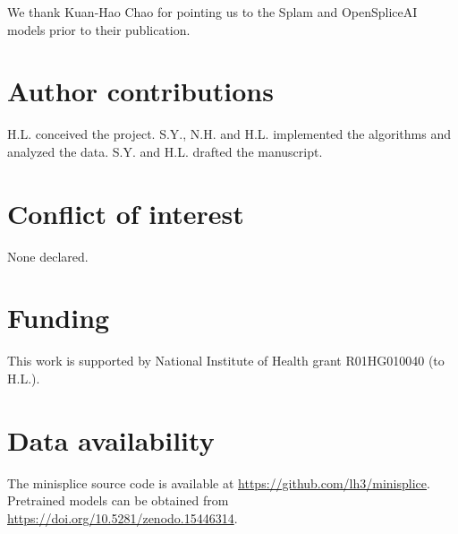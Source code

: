 \documentclass[webpdf,contemporary,large,namedate]{oup-authoring-template}%
\begin{document}
We thank Kuan-Hao Chao for pointing us to the Splam and OpenSpliceAI models prior to their publication.

\section*{Author contributions}

H.L. conceived the project.
S.Y., N.H. and H.L. implemented the algorithms and analyzed the data.
S.Y. and H.L. drafted the manuscript.

\section*{Conflict of interest}

None declared.

\section*{Funding}

This work is supported by National Institute of Health grant R01HG010040 (to H.L.).

\section*{Data availability}

The minisplice source code is available at \url{https://github.com/lh3/minisplice}.
Pretrained models can be obtained from \url{https://doi.org/10.5281/zenodo.15446314}.


{\sffamily\small
}
\end{document}
